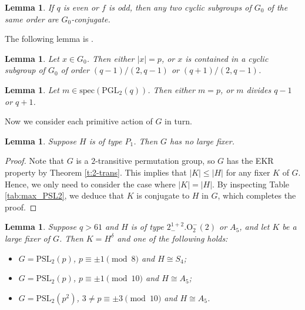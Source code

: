 \documentclass[twoside,a4paper,reqno,11pt]{amsart}
\newcommand{\<}{\langle}
\renewcommand{\>}{\rangle}
\newcommand{\leqs}{\leqslant}
\newcommand{\PSL}{\mathrm{PSL}}
\newcommand{\PGL}{\mathrm{PGL}}
\newcommand{\Spec}{\mathrm{spec}}
\newtheorem{lem}[thm]{Lemma}
\theoremstyle{definition}
\begin{document}
	\begin{lem}
		\label{l:PSL2_cyclic_conju}
		If $q$ is even or $f$ is odd, then any two cyclic subgroups of $G_0$ of the same order are $G_0$-conjugate.
	\end{lem}
	
	The following lemma is \cite[Satz 8.5]{H_book}.
	
	\begin{lem}
		\label{l:PSL2_ele_cyc}
		Let $x\in G_0$. Then either $|x| = p$, or $x$ is contained in a cyclic subgroup of $G_0$ of order $(q-1)/(2,q-1)$ or $(q+1)/(2,q-1)$.
	\end{lem}
	
	
	\begin{lem}
		\label{l:PSL2_ele_cyc_PGL}
		Let $m\in\Spec(\PGL_2(q))$. Then either $m = p$, or $m$ divides $q-1$ or $q+1$.
	\end{lem}
	
	
	Now we consider each primitive action of $G$ in turn.
	
	\begin{lem}
		\label{l:PSL2_para}
		Suppose $H$ is of type $P_1$. Then $G$ has no large fixer.
	\end{lem}
	
	\begin{proof}
		Note that $G$ is a $2$-transitive permutation group, so $G$ has the EKR property by Theorem \ref{t:2-trans}. This implies that $|K|\leqs |H|$ for any fixer $K$ of $G$. Hence, we only need to consider the case where $|K| = |H|$. By inspecting Table \ref{tab:max_PSL2}, we deduce that $K$ is conjugate to $H$ in $G$, which completes the proof.
	\end{proof}
	
	
	\begin{lem}
		\label{l:PSL2_C6_S}
		Suppose $q > 61$ and $H$ is of type $2^{1+2}_-.\mathrm{O}_2^-(2)$ or $A_5$, and let $K$ be a large fixer of $G$. Then $K = H^\delta$ and one of the following holds:
		\begin{itemize}\addtolength{\itemsep}{0.2\baselineskip}
			\item[{\rm (i)}] $G = \PSL_2(p)$, $p\equiv \pm 1\pmod 8$ and $H \cong S_4$;
			\item[{\rm (ii)}] $G = \PSL_2(p)$, $p\equiv \pm 1\pmod{10}$ and $H \cong A_5$;
			\item[{\rm (iii)}] $G = \PSL_2(p^2)$, $3\ne p\equiv\pm 3\pmod{10}$ and $H\cong A_5$.
		\end{itemize}
	\end{lem}
	
\end{document}

